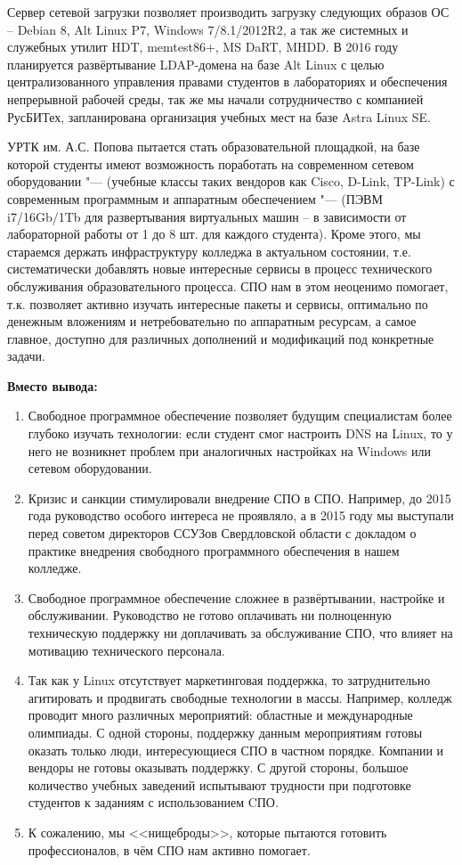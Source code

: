 \documentclass[10pt, a5paper]{article}
\begin{document}
Сервер сетевой загрузки позволяет производить загрузку следующих образов ОС – Debian 8, Alt Linux P7, Windows 7/8.1/2012R2, а так же системных и служебных утилит HDT, memtest86+, MS DaRT, MHDD. 
В 2016 году планируется развёртывание \linebreak LDAP-домена на базе Alt Linux с целью централизованного управления правами студентов в лабораториях и обеспечения непрерывной рабочей среды, так же мы начали сотрудничество с компанией РусБИТех, запланирована организация учебных мест на базе Astra Linux SE.

УРТК им. А.С. Попова пытается стать образовательной площадкой, на базе которой  студенты имеют возможность поработать на современном сетевом оборудовании "--- (учебные классы таких вендоров как Cisco, D-Link, TP-Link) с современным программным и аппаратным обеспечением "--- (ПЭВМ i7/16Gb/1Tb для развертывания виртуальных машин – в зависимости от лабораторной работы от 1 до 8 шт. для каждого студента). Кроме этого, мы стараемся держать инфраструктуру колледжа в актуальном состоянии, т.е. систематически добавлять новые интересные сервисы в процесс технического обслуживания образовательного процесса. СПО нам в этом неоценимо помогает, т.к. позволяет активно изучать интересные пакеты и сервисы, оптимально по денежным вложениям и нетребовательно по аппаратным ресурсам, а самое главное, доступно для различных дополнений и модификаций  под конкретные задачи.

\textbf{Вместо вывода:}

\begin{enumerate}
  \item Свободное программное обеспечение позволяет будущим специалистам более глубоко изучать технологии: если студент смог настроить DNS на Linux, то у него не возникнет проблем при аналогичных настройках на Windows или сетевом оборудовании.
  \item Кризис и санкции стимулировали внедрение СПО в СПО. Например, до 2015 года руководство особого интереса не проявляло, а в 2015 году мы выступали перед советом директоров ССУЗов Свердловской области с докладом о практике внедрения свободного программного обеспечения в нашем колледже.
  \item Свободное программное обеспечение сложнее в развёртывании, настройке и обслуживании. Руководство не готово оплачивать ни полноценную техническую поддержку ни доплачивать за обслуживание СПО, что влияет на мотивацию технического персонала.
  \item Так как у Linux отсутствует маркетинговая поддержка, то затруднительно агитировать и продвигать свободные технологии в массы. Например, колледж проводит много различных мероприятий: областные и международные олимпиады. С одной стороны, поддержку данным мероприятиям готовы оказать только люди, интересующиеся СПО в частном порядке. Компании и вендоры не готовы оказывать поддержку. С другой стороны, большое количество учебных заведений испытывают трудности при подготовке студентов к заданиям с использованием CПО.
  \item К сожалению, мы <<нищеброды>>, которые пытаются готовить профессионалов, в чём СПО нам активно помогает.
\end{enumerate}
\end{document}
